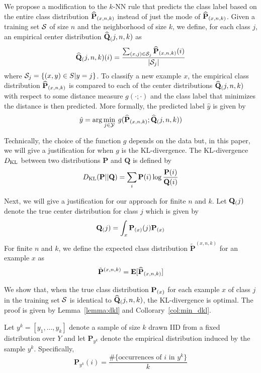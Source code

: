\documentclass{article}
\begin{document}
We propose a modification to the $k$-NN rule that predicts the class
label based on the entire class distribution $\widehat{\mathbf{P}}_{(x,n,k)}$ instead of just
the mode of $\widehat{\mathbf{P}}_{(x,n,k)}$. Given a training set $\mathcal{S}$ of size $n$ and
the neighborhood of size $k$, we define, for each class $j$, an
empirical center distribution $\widehat{\mathbf{Q}}_(j,n,k)$ as
\[
\widehat{\mathbf{Q}}_(j,n,k)(i) = \frac{\sum_{(x,j) \in \mathcal{S}_j} \widehat{\mathbf{P}}_{(x,n,k)}(i)}{|\mathcal{S}_j|}
\]
where $\mathcal{S}_j = \{ (x,y) \in S | y = j \}$.  To classify a new
example $x$, the empirical class distribution $\widehat{\mathbf{P}}_{(x,n,k)}$ is compared to
each of the center distributions $\widehat{\mathbf{Q}}_(j,n,k)$ with respect to some distance
measure $g(\cdot ; \cdot)$ and the class label that minimizes the
distance is then predicted. More formally, the predicted label
$\hat{y}$ is given by
\[
\hat{y} = \arg\min_{j \in \mathcal{Y}} \: g(\widehat{\mathbf{P}}_{(x,n,k)} ; \widehat{\mathbf{Q}}_(j,n,k))
\]

Technically, the choice of the function $g$ depends on the data but,
in this paper, we will give a justification for when $g$ is the
KL-divergence. The KL-divergence $D_{\mathrm{KL}}$ between two
distributions $\mathbf{P}$ and $\mathbf{Q}$ is defined by
\[
D_{\mathrm{KL}}(\mathbf{P} || \mathbf{Q}) = \sum_i \mathbf{P}(i) \log \frac{\mathbf{P}(i)}{\mathbf{Q}(i)}
\]

\newcommand{\Pexpected}{\tilde{\mathbf{P}}^{(x,n,k)}}

Next, we will give a justification for our approach for finite $n$ and
$k$. Let $\mathbf{Q}_(j)$ denote the true center distribution for class $j$
which is given by
\[
\mathbf{Q}_(j) = \int_x \mathbf{P}_{(x)}(j) \mathbf{P}_{(x)}
\]
For finite $n$ and $k$, we define the expected class distribution $\Pexpected$ for an example
$x$ as
\[
\Pexpected = \mathbf{E}[\Pemp]
\]








We show that, when the true class distribution $\mathbf{P}_{(x)}$ for each
example $x$ of class $j$ in the training set $\mathcal{S}$ is identical
to $\widehat{\mathbf{Q}}_(j,n,k)$, the KL-divergence is optimal. The proof is
given by Lemma~\ref{lemma:dkl} and Collorary~\ref{col:min_dkl}. 

\newcommand{\sampleYK}{y^k}
\newcommand{\sampleEmpDist}{\mathbf{P}_{y^k}}
\newcommand{\Q}{\mathbf{Q}}

Let $\sampleYK = [y_1, \ldots, y_k]$ denote a sample of size $k$ drawn IID
from a fixed distribution over $Y$ and let $\sampleEmpDist$ denote the
empirical distribution induced by the sample
$\sampleYK$. Specifically,
\[
\sampleEmpDist(i) = \frac{\#\{ \mbox{occurrences of } i \mbox{ in } y^k\}}{k}
\]
\end{document}
